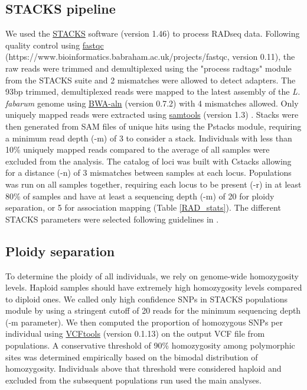 \documentclass[11pt,a4paper]{report}
\begin{document}
\subsection{STACKS pipeline}
We used the \href{http://catchenlab.life.illinois.edu/stacks/}{STACKS} software (version 1.46) \citep{Catchen2013StacksGenomics} to process RADseq data. Following quality control using \href{https://www.bioinformatics.babraham.ac.uk/projects/fastqc/}{fastqc} (https://www.bioinformatics.babraham.ac.uk/projects/fastqc, version 0.11), the raw reads were trimmed and demultiplexed using the "process radtags" module from the STACKS suite and 2 mismatches were allowed to detect adapters. The 93bp trimmed, demultiplexed reads were mapped to the latest assembly of the \textit{L. fabarum} genome using \href{http://bio-bwa.sourceforge.net/}{BWA-aln} (version 0.7.2) \citep{Li2009} with 4 mismatches allowed. Only uniquely mapped reads were extracted using \href{http://www.htslib.org/}{samtools} (version 1.3) \citep{Li2009TheSAMtools}. Stacks were then generated from SAM files of unique hits using the Pstacks module, requiring a minimum read depth (-m) of 3 to consider a stack. Individuals with less than 10\% uniquely mapped reads compared to the average of all samples were excluded from the analysis. The catalog of loci was built with Cstacks allowing for a distance (-n) of 3 mismatches between samples at each locus. Populations was run on all samples together, requiring each locus to be present (-r) in at least 80\% of samples and have at least a sequencing depth (-m) of 20 for ploidy separation, or 5 for association mapping (Table \ref{RAD_stats}). The different STACKS parameters were selected following guidelines in \citet{Paris2016}.

\subsection{Ploidy separation}
To determine the ploidy of all individuals, we rely on genome-wide homozygosity levels. Haploid samples should have extremely high homozygosity levels compared to diploid ones. We called only high confidence SNPs in STACKS populations module by using a stringent cutoff of 20 reads for the minimum sequencing depth (-m parameter). We then computed the proportion of homozygous SNPs per individual using \href{https://vcftools.github.io}{VCFtools} (version 0.1.13) \citep{Danecek2011TheVCFtools} on the output VCF file from populations. A conservative threshold of 90\% homozygosity among polymorphic sites was determined empirically based on the bimodal distribution of homozygosity. Individuals above that threshold were considered haploid and excluded from the subsequent populations run used the main analyses.
\end{document}
